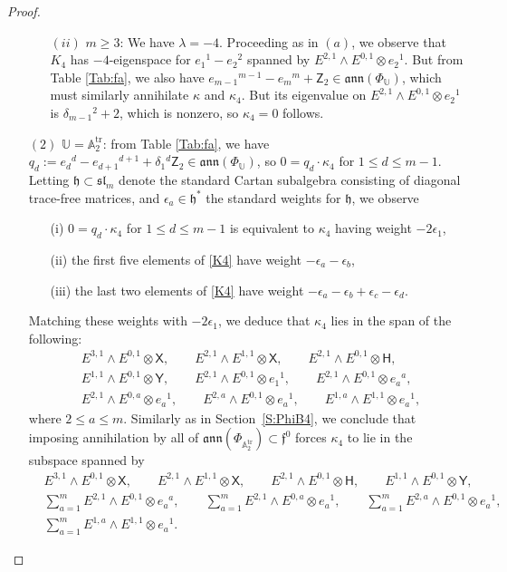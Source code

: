 \documentclass[10pt,a4paper]{amsart}
\newcommand\tensor{\otimes}
\DeclareMathOperator{\tr}{tr}
\newcommand{\fh}{\mathfrak{h}}
\newcommand\fann{\mathfrak{ann}}
\newcommand\ff{\mathfrak{f}}
\newcommand\fsl{\mathfrak{sl}}
\newcommand\bbU{\mathbb{U}}
\newcommand\bbA{\mathbb{A}}
\newcommand\sfX{\mathsf{X}}
\newcommand\sfH{\mathsf{H}}
\newcommand\sfY{\mathsf{Y}}
\newcommand\sfZ{\mathsf{Z}}
\numberwithin{equation}{section}
\begin{document}
\begin{proof}
\begin{itemize}
\begin{itemize}
\item[$(ii)$] $m\geq 3$: We have $\lambda = -4$. Proceeding as in $(a)$, we observe that $K_4$ has $-4$-eigenspace for $e_1{}^1 - e_2{}^2$ spanned by $E^{2,1} \wedge E^{0,1} \tensor e_2{}^1$. But from Table {\rm \ref{Tab:fa}}, we also have $e_{m-1}{}^{m-1} -e_m{}^m + \sfZ_2 \in \fann(\Phi_\bbU)$, which must similarly annihilate $\kappa$ and $\kappa_4$. But its eigenvalue on $E^{2,1} \wedge E^{0,1} \tensor e_2{}^1$ is $\delta_{m-1}{}^2 +2$, which is nonzero, so $\kappa_4 = 0$ follows.
\end{itemize}

\item [$(2)$] $\bbU = \bbA_2^{\tr}$: from Table \ref{Tab:fa}, we have $q_d := e_d{}^d - e_{d+1}{}^{d+1} + \delta_1{}^d \sfZ_2 \in \fann(\Phi_{\bbU})$, so $0 = q_d \cdot \kappa_4$ for $1 \leq d \leq m-1$. Letting $\fh \subset \fsl_m$ denote the standard Cartan subalgebra consisting of diagonal trace-free matrices, and $\epsilon_a \in \fh^*$ the standard weights for $\fh$, we observe
 \begin{itemize}\itemsep=0pt
 \item[(i)] $0 = q_d \cdot \kappa_4$ for $1 \leq d \leq m-1$ is equivalent to $\kappa_4$ having weight $-2\epsilon_1$,
 \item[(ii)] the first five elements of \eqref{K4} have weight $-\epsilon_a - \epsilon_b$,
 \item[(iii)] the last two elements of \eqref{K4} have weight $-\epsilon_a - \epsilon_b + \epsilon_c - \epsilon_d$.
 \end{itemize}
 Matching these weights with $-2\epsilon_1$, we deduce that $\kappa_4$ lies in the span of the following:
\begin{align*}%
&E^{3,1} \wedge E^{0,1} \tensor \sfX, \qquad E^{2,1} \wedge E^{1,1} \tensor \sfX, \qquad E^{2,1} \wedge E^{0,1} \tensor \sfH,\\
&E^{1,1}\wedge E^{0,1} \tensor \sfY, \qquad E^{2,1} \wedge E^{0,1} \tensor e_1{}^1, \qquad E^{2,1} \wedge E^{0,1} \tensor e_a{}^a, \\
&E^{2,1} \wedge E^{0,a} \tensor e_a{}^1, \qquad E^{2,a} \wedge E^{0,1} \tensor e_a{}^1, \qquad E^{1,a} \wedge E^{1,1} \tensor e_a{}^1,
\end{align*}
where $2 \leq a \leq m$. Similarly as in Section~\ref{S:PhiB4}, we conclude that imposing annihilation by all of $\fann(\Phi_{\bbA_2^{\tr}}) \subset \ff^0$ forces $\kappa_4$ to lie in the subspace spanned by
\begin{align}
&E^{3,1} \wedge E^{0,1} \tensor \sfX, \qquad E^{2,1} \wedge E^{1,1} \tensor \sfX, \qquad E^{2,1} \wedge E^{0,1} \tensor \sfH, \qquad E^{1,1} \wedge E^{0,1} \tensor \sfY, \nonumber\\
& \sum_{a=1}^m E^{2,1} \wedge E^{0,1} \tensor e_a{}^a, \qquad \sum_{a=1}^m E^{2,1} \wedge E^{0,a} \tensor e_a{}^1, \qquad \sum_{a=1}^m E^{2,a} \wedge E^{0,1} \tensor e_a{}^1, \nonumber\\
& \sum_{a=1}^m E^{1,a} \wedge E^{1,1} \tensor e_a{}^1.\label{E:offdiag}
\end{align}


\end{itemize}
\end{proof}
\end{document}
